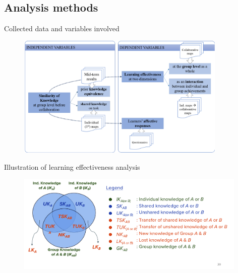 \subsection{Analysis methods}
\begin{frame}{Collected data and variables involved}
    \begin{figure}[tb]
     \begin{center}
      \includegraphics[width=100mm]{images/rqb_variables.pdf}
      \end{center}
\end{figure}
\end{frame}

\begin{frame}{Illustration of learning effectiveness analysis}
    \begin{figure}[tb]
     \begin{center}
      \includegraphics[width=110mm]{images/rqb_learning_effectiveness.png}
      \end{center}
      \label{learn-effective}  
    \end{figure}
\end{frame}

